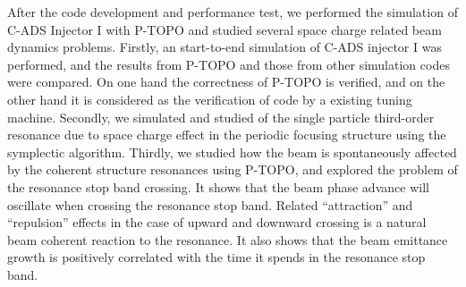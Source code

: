 After the code development and performance test, we performed the simulation of C-ADS Injector I with P-TOPO
and studied several space charge related beam dynamics problems.
Firstly, an start-to-end simulation of C-ADS injector I was performed,
and the results from P-TOPO and those from other simulation codes were compared.
On one hand the correctness of P-TOPO is verified,
and on the other hand it is considered as the verification of code by a existing tuning machine.
Secondly, we simulated and studied of the  single particle third-order resonance due to space charge effect
in the periodic focusing structure using the symplectic algorithm.
Thirdly, we studied how the beam is spontaneously affected by the coherent structure resonances using P-TOPO,
and explored the problem of the resonance stop band crossing.
It shows that the beam phase advance will oscillate when crossing the resonance stop band.
Related ``attraction'' and ``repulsion'' effects in the case of upward
and downward crossing is a natural beam coherent reaction to the resonance.
It also shows that the beam emittance growth is positively correlated with the time it spends in the resonance stop band.



